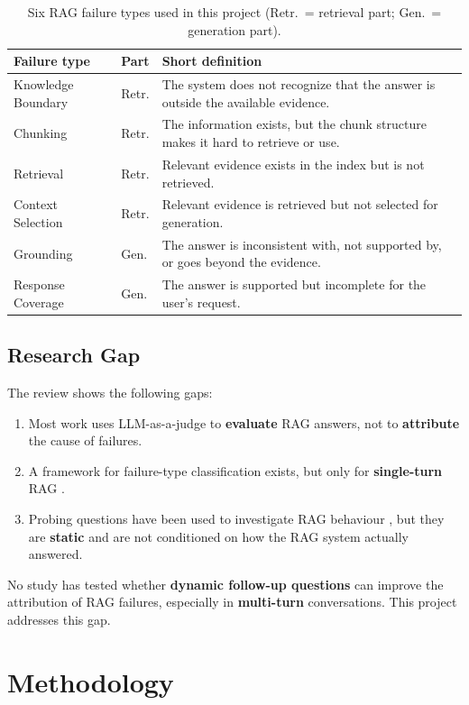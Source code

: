 \documentclass[11pt]{article}
\begin{document}
\begin{table}[t]
\centering\small
\begin{tabularx}{\columnwidth}{@{}l l L@{}}
\toprule
\textbf{Failure type} & \textbf{Part} & \textbf{Short definition} \\
\midrule
Knowledge Boundary & Retr. & The system does not recognize that the answer is outside the available evidence. \\
Chunking & Retr. & The information exists, but the chunk structure makes it hard to retrieve or use. \\
Retrieval & Retr. & Relevant evidence exists in the index but is not retrieved. \\
Context Selection & Retr. & Relevant evidence is retrieved but not selected for generation. \\
Grounding & Gen. & The answer is inconsistent with, not supported by, or goes beyond the evidence. \\
Response Coverage & Gen. & The answer is supported but incomplete for the user's request. \\
\bottomrule
\end{tabularx}
\caption{Six RAG failure types used in this project (Retr.\ = retrieval part; Gen.\ = generation part).}
\label{tab:failures}
\end{table}

\subsection{Research Gap}
The review shows the following gaps:
\begin{enumerate}
  \item Most work uses LLM-as-a-judge to \textbf{evaluate} RAG answers, not to \textbf{attribute} the cause of failures.
  \item A framework for failure-type classification exists, but only for \textbf{single-turn} RAG \citep{leung2025ragec}.
  \item Probing questions have been used to investigate RAG behaviour \citep{xie2024subquestion}, but they are \textbf{static} and are not conditioned on how the RAG system actually answered.
\end{enumerate}
No study has tested whether \textbf{dynamic follow-up questions} can improve the attribution of RAG failures, especially in \textbf{multi-turn} conversations. This project addresses this gap.

\section{Methodology}
\label{sec:method}
\end{document}
